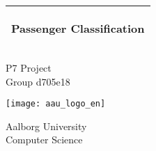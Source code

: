 \begin{titlepage}
  \noindent%
  \begin{tabular}{@{}p{\textwidth}@{}}
    \toprule[2pt]
    \midrule
    \vspace{0.2cm}
    \begin{center}
    \LARGE{\textbf{
      Passenger Classification%
    }}
    \end{center}
    \vspace{0.2cm}\\
    \midrule
    \toprule[2pt]
  \end{tabular}
  \vspace{4 cm}
  \begin{center}
    \vspace{0.2cm}
    {\Large
     P7 Project\\Group d705e18 %
      \break
      
      \texttt{[image: aau\_logo\_en]}
    }
  \end{center}
  \vfill
  \begin{center}
  Aalborg University\\
  Computer Science
  \end{center}
\end{titlepage}
\cleardoublepage
